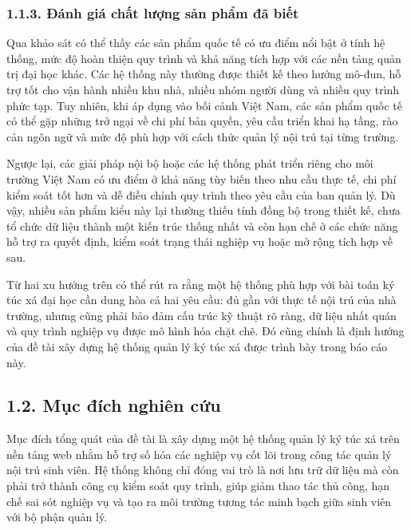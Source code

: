 \documentclass[12pt]{article}
\begin{document}
\subsubsection*{1.1.3. Đánh giá chất lượng sản phẩm đã biết}

Qua khảo sát có thể thấy các sản phẩm quốc tế có ưu điểm nổi bật ở tính hệ thống, mức độ hoàn thiện quy trình và khả năng tích hợp với các nền tảng quản trị đại học khác. Các hệ thống này thường được thiết kế theo hướng mô-đun, hỗ trợ tốt cho vận hành nhiều khu nhà, nhiều nhóm người dùng và nhiều quy trình phức tạp. Tuy nhiên, khi áp dụng vào bối cảnh Việt Nam, các sản phẩm quốc tế có thể gặp những trở ngại về chi phí bản quyền, yêu cầu triển khai hạ tầng, rào cản ngôn ngữ và mức độ phù hợp với cách thức quản lý nội trú tại từng trường.

Ngược lại, các giải pháp nội bộ hoặc các hệ thống phát triển riêng cho môi trường Việt Nam có ưu điểm ở khả năng tùy biến theo nhu cầu thực tế, chi phí kiểm soát tốt hơn và dễ điều chỉnh quy trình theo yêu cầu của ban quản lý. Dù vậy, nhiều sản phẩm kiểu này lại thường thiếu tính đồng bộ trong thiết kế, chưa tổ chức dữ liệu thành một kiến trúc thống nhất và còn hạn chế ở các chức năng hỗ trợ ra quyết định, kiểm soát trạng thái nghiệp vụ hoặc mở rộng tích hợp về sau.

Từ hai xu hướng trên có thể rút ra rằng một hệ thống phù hợp với bài toán ký túc xá đại học cần dung hòa cả hai yêu cầu: đủ gần với thực tế nội trú của nhà trường, nhưng cũng phải bảo đảm cấu trúc kỹ thuật rõ ràng, dữ liệu nhất quán và quy trình nghiệp vụ được mô hình hóa chặt chẽ. Đó cũng chính là định hướng của đề tài xây dựng hệ thống quản lý ký túc xá được trình bày trong báo cáo này.

\subsection*{1.2. Mục đích nghiên cứu}

Mục đích tổng quát của đề tài là xây dựng một hệ thống quản lý ký túc xá trên nền tảng web nhằm hỗ trợ số hóa các nghiệp vụ cốt lõi trong công tác quản lý nội trú sinh viên. Hệ thống không chỉ đóng vai trò là nơi lưu trữ dữ liệu mà còn phải trở thành công cụ kiểm soát quy trình, giúp giảm thao tác thủ công, hạn chế sai sót nghiệp vụ và tạo ra môi trường tương tác minh bạch giữa sinh viên với bộ phận quản lý.
\end{document}
